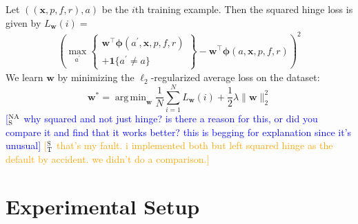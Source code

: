 \documentclass[11pt,a4paper]{article}
\newcommand{\indicator}[1]{I_{\{#1\}}} %
\DeclareMathOperator*{\argmax}{arg\,max}
\DeclareMathOperator*{\argmin}{arg\,min}
\newcommand{\ensuretext}[1]{#1}
\newcommand{\nssmarker}{\ensuretext{\textcolor{magenta}{\ensuremath{^{\textsc{NS}}_{\textsc{S}}}}}}
\newcommand{\stmarker}{\ensuretext{\textcolor{orange}{\ensuremath{^{\textsc{S}}_{\textsc{T}}}}}}
\newcommand{\nasmarker}{\ensuretext{\textcolor{blue}{\ensuremath{^{\textsc{NA}}_{\textsc{S}}}}}}
\newcommand{\arkcomment}[3]{\ensuretext{\textcolor{#3}{[#1 #2]}}}
\newcommand{\nss}[1]{\arkcomment{\nssmarker}{#1}{magenta}}
\newcommand{\st}[1]{\arkcomment{\stmarker}{#1}{orange}}
\newcommand{\nascomment}[1]{\arkcomment{\nasmarker}{#1}{blue}}
\begin{document}
% 

Let $((\mathbf{x}, p, f, r), a)$ %
be the $i$th training example.
Then the squared hinge loss is given by $L_{\mathbf{w}}(i) =$
\begin{align*}
\left(\max_{a^\prime} \left\{ \begin{array}{c} \mathbf{w}^\top \mathbf{\phi}(a^\prime, \mathbf{x}, p, f,
r) \\ + \boldsymbol{1}\{a^\prime \not = a\} \end{array}\right \} - 
  \mathbf{w}^\top \mathbf{\phi}(a, \mathbf{x}, p, f, r)\right)^2
\end{align*}
We learn $\mathbf{w}$ by minimizing the $\ell_2$-regularized average loss on the dataset:
\begin{equation}
\mathbf{w^*} = \argmin_\mathbf{w}{
    \frac{1}{N}\sum_{i = 1}^N L_{\mathbf{w}}(i) + \frac{1}{2} \lambda \| \mathbf{w} \|_2^2
}
\end{equation}
\nascomment{why squared and not just hinge?  is there a reason for
  this, or did you compare it and find that it works better?  this is
  begging for explanation since it's unusual}
\st{that's my fault. i implemented both but left squared hinge as the default
by accident. we didn't do a comparison.}

\section{Experimental Setup}
\end{document}
